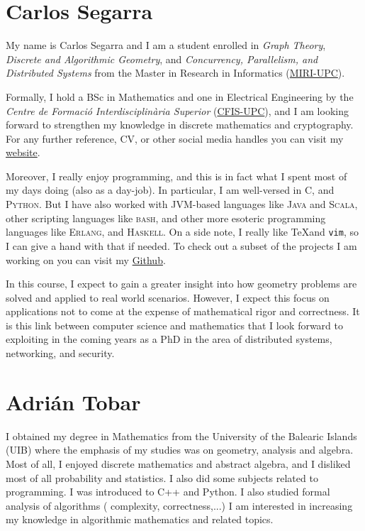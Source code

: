 \documentclass[11pt]{amsart}
\begin{document}
\section*{Carlos Segarra}

My name is Carlos Segarra and I am a student enrolled in \textit{Graph Theory}, \textit{Discrete and Algorithmic Geometry}, and \textit{Concurrency, Parallelism, and Distributed Systems} from the Master in Research in Informatics (\href{https://www.fib.upc.edu/en/studies/masters/master-innovation-and-research-informatics}{MIRI-UPC}).

Formally, I hold a BSc in Mathematics and one in Electrical Engineering by the \textit{Centre de Formaci\'o Interdisciplin\`aria Superior} (\href{https://cfis.upc.edu}{CFIS-UPC}), and I am looking forward to strengthen my knowledge in discrete mathematics and cryptography.
For any further reference, CV, or other social media handles you can visit my \href{https://carlossegarra.com}{website}.

Moreover, I really enjoy programming, and this is in fact what I spent most of my days doing (also as a day-job).
In particular, I am well-versed in \textsc{C}, and \textsc{Python}.
But I have also worked with JVM-based languages like \textsc{Java} and \textsc{Scala}, other scripting languages like \textsc{bash}, and other more esoteric programming languages like \textsc{Erlang}, and \textsc{Haskell}. 
On a side note, I really like \TeX and \texttt{vim}, so I can give a hand with that if needed.
To check out a subset of the projects I am working on you can visit my \href{https://github.com/csegarragonz}{Github}.

In this course, I expect to gain a greater insight into how geometry problems are solved and applied to real world scenarios.
However, I expect this focus on applications not to come at the expense of mathematical rigor and correctness.
It is this link between computer science and mathematics that I look forward to exploiting in the coming years as a PhD in the area of distributed systems, networking, and security.

\medskip

\section*{Adrián Tobar}


I obtained my degree in Mathematics from the University of the Balearic Islands (UIB) where the emphasis of my studies was on geometry, analysis and algebra.
Most of all, I enjoyed discrete mathematics and abstract algebra, and I disliked most of all probability and statistics.
I also did some subjects related to programming. I was introduced to C++ and Python. I also studied formal analysis of algorithms ( complexity, correctness,...)
I am interested in increasing my knowledge in algorithmic mathematics and related topics.
\end{document}
